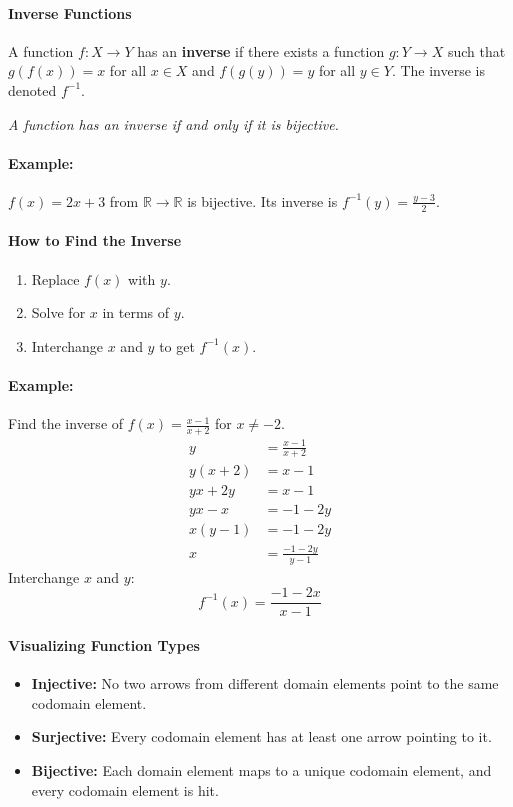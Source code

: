 \paragraph*{Inverse Functions}
A function $f: X \to Y$ has an \textbf{inverse} if there exists a function $g: Y \to X$ such that $g(f(x)) = x$ for all $x \in X$ and $f(g(y)) = y$ for all $y \in Y$. The inverse is denoted $f^{-1}$.

\textit{A function has an inverse if and only if it is bijective.}

\paragraph*{Example:} $f(x) = 2x + 3$ from $\mathbb{R} \to \mathbb{R}$ is bijective. Its inverse is $f^{-1}(y) = \frac{y - 3}{2}$.

\paragraph*{How to Find the Inverse}
\begin{enumerate}
    \item Replace $f(x)$ with $y$.
    \item Solve for $x$ in terms of $y$.
    \item Interchange $x$ and $y$ to get $f^{-1}(x)$.
\end{enumerate}

\paragraph*{Example:} Find the inverse of $f(x) = \frac{x-1}{x+2}$ for $x \neq -2$.
\begin{align*}
    y &= \frac{x-1}{x+2} \\
    y(x+2) &= x-1 \\
    yx + 2y &= x-1 \\
    yx - x &= -1 - 2y \\
    x(y-1) &= -1 - 2y \\
    x &= \frac{-1-2y}{y-1}
\end{align*}
Interchange $x$ and $y$:
\begin{equation*}
    f^{-1}(x) = \frac{-1-2x}{x-1}
\end{equation*}

\paragraph*{Visualizing Function Types}
\begin{itemize}
    \item \textbf{Injective:} No two arrows from different domain elements point to the same codomain element.
    \item \textbf{Surjective:} Every codomain element has at least one arrow pointing to it.
    \item \textbf{Bijective:} Each domain element maps to a unique codomain element, and every codomain element is hit.
\end{itemize}

